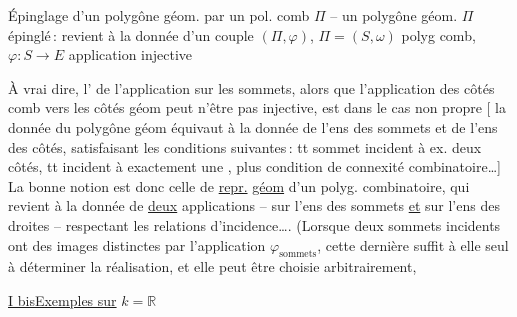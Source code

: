 Épinglage d'un polygône géom. par
un pol. comb $\Pi$ -- un polygône
géom. $\Pi$ épinglé\,: revient à la donnée
d'un couple  $(\Pi,\varphi)$, $\Pi=(S,\omega)$
polyg comb, $\varphi:S\longrightarrow E$ application injective

À vrai dire, l' de l'application sur
les sommets, alors que l'application  des
côtés comb vers les côtés géom peut
n'être pas injective, est 
dans le cas non propre [  la donnée
du polygône géom  équivaut à la donnée
de l'ens des sommets et de l'ens
des côtés, satisfaisant les conditions suivantes\,: 
tt sommet incident à ex. deux côtés, tt
 incident à exactement une ,
 plus condition de connexité combinatoire\ldots]
La bonne notion est
donc celle de \uline{repr.}  \uline{géom} d'un polyg.
combinatoire, qui revient à la donnée
de \uline{deux} applications -- sur l'ens des
sommets \uline{et} sur l'ens des droites --
respectant les relations d'incidence\ldots.
(Lorsque deux sommets incidents ont
  des images
 distinctes
par l'application $\varphi_{\mathrm{sommets}}$, cette dernière
suffit à elle seul à déterminer la réalisation,
et elle peut être choisie arbitrairement,

\uline{I bis}\qquad \uline{Exemples sur} $k=\mathbb{R}$

